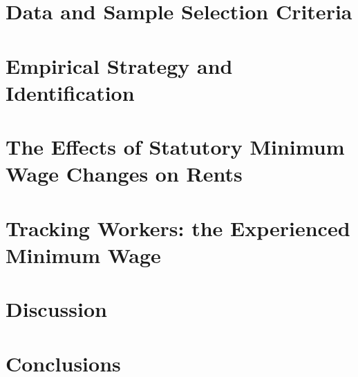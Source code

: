 \documentclass{article}
\begin{document}
\section{Data and Sample Selection Criteria}\label{sec:data}
	

\section{Empirical Strategy and Identification}\label{sec:empirical_strategy}
    

\section{The Effects of Statutory Minimum Wage Changes on Rents}\label{sec:results}
    

\section{Tracking Workers: the Experienced Minimum Wage}\label{sec:experienced_mw}
	

\section{Discussion}\label{sec:discussion}
	

\section{Conclusions}\label{sec:conclusion}
    

 


\clearpage
\printbibliography


\clearpage

\section*{}
\vspace{5mm}

\appendix

\renewcommand\thetable{\thesection.\arabic{table}}    
\renewcommand\thefigure{\thesection.\arabic{figure}} 
\setcounter{table}{0}
\setcounter{figure}{0}

\end{document}
